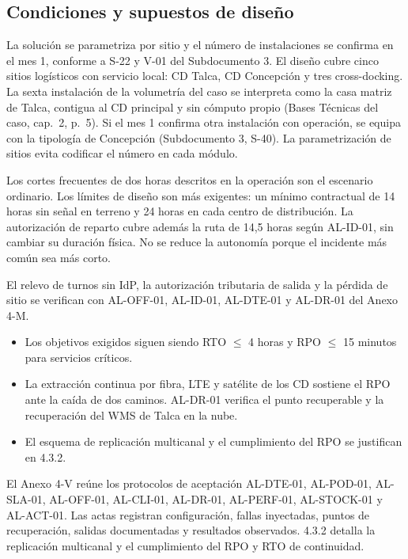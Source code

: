 \subsection{Condiciones y supuestos de diseño}
\label{sec:contradicciones}

La solución se parametriza por sitio y el número de instalaciones se confirma en el mes 1, conforme a S-22 y V-01 del Subdocumento 3. El diseño cubre cinco sitios logísticos con servicio local: CD Talca, CD Concepción y tres cross-docking. La sexta instalación de la volumetría del caso se interpreta como la casa matriz de Talca, contigua al CD principal y sin cómputo propio (Bases Técnicas del caso, cap.~2, p.~5). Si el mes 1 confirma otra instalación con operación, se equipa con la tipología de Concepción (Subdocumento 3, S-40). La parametrización de sitios evita codificar el número en cada módulo.

Los cortes frecuentes de dos horas descritos en la operación son el escenario ordinario. Los límites de diseño son más exigentes: un mínimo contractual de 14 horas sin señal en terreno y 24 horas en cada centro de distribución. La autorización de reparto cubre además la ruta de 14,5 horas según AL-ID-01, sin cambiar su duración física. No se reduce la autonomía porque el incidente más común sea más corto.

El relevo de turnos sin IdP, la autorización tributaria de salida y la pérdida de sitio se verifican con AL-OFF-01, AL-ID-01, AL-DTE-01 y AL-DR-01 del Anexo 4-M.

\begin{itemize}
  \item Los objetivos exigidos siguen siendo RTO $\leq$ 4 horas y RPO $\leq$ 15 minutos para servicios críticos.
  \item La extracción continua por fibra, LTE y satélite de los CD sostiene el RPO ante la caída de dos caminos. AL-DR-01 verifica el punto recuperable y la recuperación del WMS de Talca en la nube.
  \item El esquema de replicación multicanal y el cumplimiento del RPO se justifican en 4.3.2.
\end{itemize}


El Anexo 4-V reúne los protocolos de aceptación AL-DTE-01, AL-POD-01, AL-SLA-01, AL-OFF-01, AL-CLI-01, AL-DR-01, AL-PERF-01, AL-STOCK-01 y AL-ACT-01. Las actas registran configuración, fallas inyectadas, puntos de recuperación, salidas documentadas y resultados observados. 4.3.2 detalla la replicación multicanal y el cumplimiento del RPO y RTO de continuidad.
